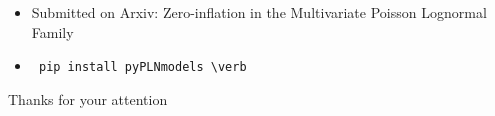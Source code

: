 \documentclass{beamer}
\theoremstyle{remark}
\begin{document}
\begin{frame}
    \begin{itemize}
    \item Submitted on Arxiv: Zero-inflation in the Multivariate Poisson Lognormal Family
    \item \verb| pip install pyPLNmodels \verb|
\end{itemize}

\end{frame}
\begin{frame}
    \centering \Huge Thanks for your attention \\
\end{frame}
\end{document}
